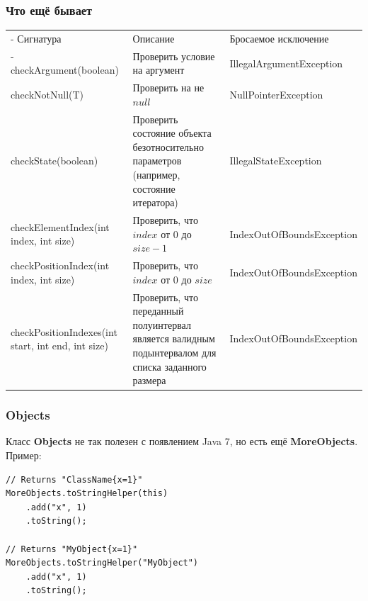 \documentclass[xetex,mathserif,serif]{beamer}
\begin{document}
	\begin{frame}
		\frametitle{Что ещё бывает}
		\begin{scriptsize}
			\begin{tabu} {| X[0.9 l p] | X[1 l p] | X[1 l p] |}
				\tabucline-
				Сигнатура                                          & Описание                                                                                            & Бросаемое исключение      \\
				\tabucline-
				\everyrow{\tabucline-}
				checkArgument(boolean)                             & Проверить условие на аргумент                                                                       & IllegalArgumentException  \\
				checkNotNull(T)                                    & Проверить на не $null$                                                                              & NullPointerException      \\
				checkState(boolean)                                & Проверить состояние объекта безотносительно параметров (например, состояние итератора)              & IllegalStateException     \\
				checkElementIndex(int index, int size)             & Проверить, что $index$ от $0$ до $size - 1$                                                         & IndexOutOfBoundsException \\
				checkPositionIndex(int index, int size)            & Проверить, что $index$ от $0$ до $size$                                                             & IndexOutOfBoundsException \\
				checkPositionIndexes(int start, int end, int size) & Проверить, что переданный полуинтервал является валидным подынтервалом для списка заданного размера & IndexOutOfBoundsException \\
			\end{tabu}
		\end{scriptsize}
	\end{frame}

	\begin{frame}[fragile]
		\frametitle{Objects}
		Класс \textbf{Objects} не так полезен с появлением Java 7, но есть ещё \textbf{MoreObjects}. Пример:
		\begin{verbatim}
// Returns "ClassName{x=1}"
MoreObjects.toStringHelper(this)
    .add("x", 1)
    .toString();

// Returns "MyObject{x=1}"
MoreObjects.toStringHelper("MyObject")
    .add("x", 1)
    .toString();
		\end{verbatim}
\end{frame}
\end{document}
